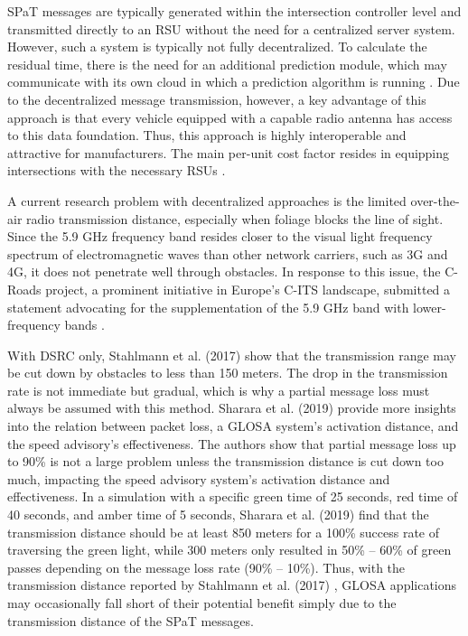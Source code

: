 SPaT messages are typically generated within the intersection controller level \cite{zweck_traffic_2013} and transmitted directly to an RSU without the need for a centralized server system. However, such a system is typically not fully decentralized. To calculate the residual time, there is the need for an additional prediction module, which may communicate with its own cloud in which a prediction algorithm is running \cite{strobl_c-its_2019, neuner_leitfaden_2020}. Due to the decentralized message transmission, however, a key advantage of this approach is that every vehicle equipped with a capable radio antenna has access to this data foundation. Thus, this approach is highly interoperable and attractive for manufacturers. The main per-unit cost factor resides in equipping intersections with the necessary RSUs \cite{niebel_cost-benefit-based_2013}.

A current research problem with decentralized approaches is the limited over-the-air radio transmission distance, especially when foliage blocks the line of sight. Since the 5.9 GHz frequency band resides closer to the visual light frequency spectrum of electromagnetic waves than other network carriers, such as 3G and 4G, it does not penetrate well through obstacles. In response to this issue, the C-Roads project, a prominent initiative in Europe's C-ITS landscape, submitted a statement advocating for the supplementation of the 5.9 GHz band with lower-frequency bands \cite{bohm_radio_2017}.

With DSRC only, Stahlmann et al. (2017) \cite{stahlmann_multi-hop_2017} show that the transmission range may be cut down by obstacles to less than 150 meters. The drop in the transmission rate is not immediate but gradual, which is why a partial message loss must always be assumed with this method. Sharara et al. (2019) \cite{sharara_impact_2019} provide more insights into the relation between packet loss, a GLOSA system's activation distance, and the speed advisory's effectiveness. The authors show that partial message loss up to 90\% is not a large problem unless the transmission distance is cut down too much, impacting the speed advisory system's activation distance and effectiveness. In a simulation with a specific green time of 25 seconds, red time of 40 seconds, and amber time of 5 seconds, Sharara et al. (2019) \cite{sharara_impact_2019} find that the transmission distance should be at least 850 meters for a 100\% success rate of traversing the green light, while 300 meters only resulted in 50\% -- 60\% of green passes depending on the message loss rate (90\% -- 10\%). Thus, with the transmission distance reported by Stahlmann et al. (2017) \cite{stahlmann_multi-hop_2017}, GLOSA applications may occasionally fall short of their potential benefit simply due to the transmission distance of the SPaT messages.

